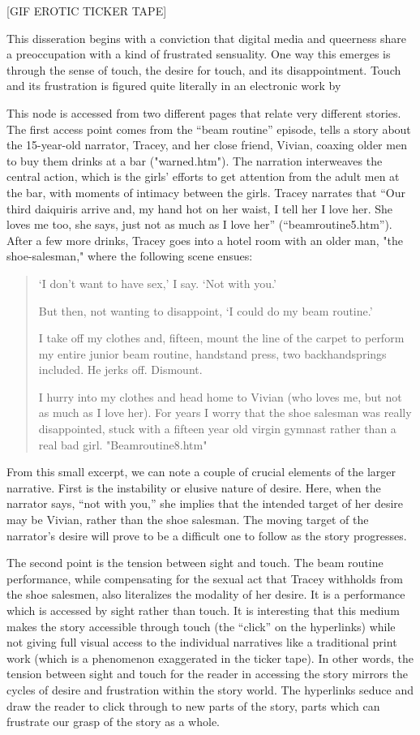\documentclass[11pt]{article}
\begin{document}
[GIF EROTIC TICKER TAPE]

This disseration begins with a conviction that digital media and
queerness share a preoccupation with a kind of frustrated
sensuality. One way this emerges is through the sense of touch, the
desire for touch, and its disappointment. Touch and its frustration is
figured quite literally in an electronic work by 

This node is accessed from two different pages that relate very
different stories. The first access point comes from the “beam
routine” episode, tells a story about the 15-year-old narrator,
Tracey, and her close friend, Vivian, coaxing older men to buy them
drinks at a bar ("warned.htm"). The narration interweaves the central
action, which is the girls’ efforts to get attention from the adult
men at the bar, with moments of intimacy between the girls. Tracey
narrates that “Our third daiquiris arrive and, my hand hot on her
waist, I tell her I love her. She loves me too, she says, just not as
much as I love her” (“beamroutine5.htm”). After a few more drinks,
Tracey goes into a hotel room with an older man, "the shoe-salesman,"
where the following scene ensues: 
\begin{quote}
‘I don’t want to have sex,’ I say. ‘Not with you.’

But then, not wanting to disappoint, ‘I could do my beam routine.’  

I take off my clothes and, fifteen, mount the line of the carpet to
perform my entire junior beam routine, handstand press, two
backhandsprings included. He jerks off. Dismount.  

I hurry into my clothes and head home to Vivian (who loves me, but not
as much as I love her). For years I worry that the shoe salesman was
really disappointed, stuck with a fifteen year old virgin gymnast
rather than a real bad girl. "Beamroutine8.htm"
\end{quote}
From this small excerpt, we can note a couple of crucial elements of
the larger narrative. First is the instability or elusive nature of
desire. Here, when the narrator says, “not with you,” she implies that
the intended target of her desire may be Vivian, rather than the shoe
salesman. The moving target of the narrator’s desire will prove to be
a difficult one to follow as the story progresses. 

The second point is the tension between sight and touch. The beam
routine performance, while compensating for the sexual act that Tracey
withholds from the shoe salesmen, also literalizes the modality of her
desire. It is a performance which is accessed by sight rather than
touch. It is interesting that this medium makes the story accessible
through touch (the “click” on the hyperlinks) while not giving full
visual access to the individual narratives like a traditional print
work (which is a phenomenon exaggerated in the ticker tape). In other
words, the tension between sight and touch for the reader in accessing
the story mirrors the cycles of desire and frustration within the
story world. The hyperlinks seduce and draw the reader to click
through to new parts of the story, parts which can frustrate our grasp
of the story as a whole.
\end{document}
